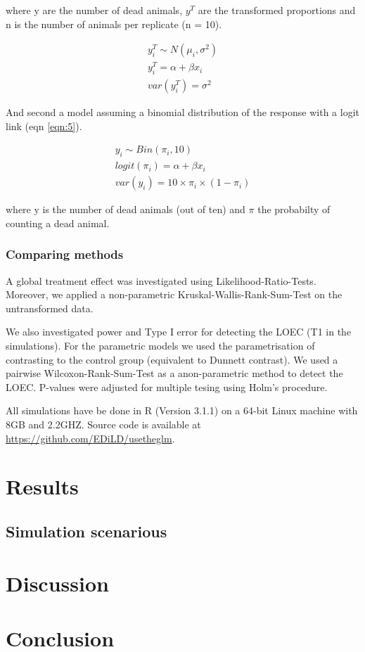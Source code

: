 \documentclass{scrartcl}\usepackage[]{graphicx}\usepackage[]{color}
\begin{document}
where y are the number of dead animals, $y^T$ are the transformed proportions and n is the number of animals per replicate (n = 10).

\begin{align}
  y^T_i \sim N(\mu_i, \sigma^2) \nonumber \\
  y^T_i = \alpha + \beta x_i \label{eqn:4} \\
  var(y^T_i) = \sigma^2 \nonumber
\end{align}

And second a model assuming a binomial distribution of the response with a logit link (eqn \ref{eqn:5}).

\begin{align}
  y_i \sim Bin(\pi_i, 10) \nonumber \\
  logit(\pi_i) = \alpha + \beta x_i \label{eqn:5} \\
  var(y_i) = 10 \times \pi_i \times (1 - \pi_i) \nonumber
\end{align}

where y is the number of dead animals (out of ten) and $\pi$ the probabilty of counting a dead animal.

\subsubsection{Comparing methods}
A global treatment effect was investigated using Likelihood-Ratio-Tests.
Moreover, we applied a non-parametric Kruskal-Wallis-Rank-Sum-Test on the untransformed data.

We also investigated power and Type I error for detecting the LOEC (T1 in the simulations).
For the parametric models we used the parametrisation of contrasting to the control group (equivalent to Dunnett contrast).
We used a pairwise Wilcoxon-Rank-Sum-Test as a anon-parametric method to detect the LOEC.
P-values were adjusted for multiple tesing using Holm's procedure.

All simulations have be done in R (Version 3.1.1) on a 64-bit Linux machine with 8GB and 2.2GHZ.
Source code is available at \url{https://github.com/EDiLD/usetheglm}. 


\section{Results}
\subsection{Simulation scenarious}



\section{Discussion}


\section{Conclusion}




\end{document}
